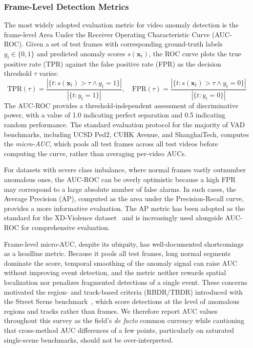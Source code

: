 \documentclass[10pt,a4paper]{article}
\begin{document}
\subsubsection{Frame-Level Detection Metrics}
\label{subsubsec:frame_metrics}

The most widely adopted evaluation metric for video anomaly detection is the frame-level Area Under the Receiver Operating Characteristic Curve (AUC-ROC). Given a set of test frames with corresponding ground-truth labels $y_t \in \{0, 1\}$ and predicted anomaly scores $s(\mathbf{x}_t)$, the ROC curve plots the true positive rate (TPR) against the false positive rate (FPR) as the decision threshold $\tau$ varies:
\begin{equation}
    \text{TPR}(\tau) = \frac{|\{t : s(\mathbf{x}_t) > \tau \wedge y_t = 1\}|}{|\{t : y_t = 1\}|}, \quad
    \text{FPR}(\tau) = \frac{|\{t : s(\mathbf{x}_t) > \tau \wedge y_t = 0\}|}{|\{t : y_t = 0\}|}
    \label{eq:tpr_fpr}
\end{equation}
The AUC-ROC provides a threshold-independent assessment of discriminative power, with a value of 1.0 indicating perfect separation and 0.5 indicating random performance. The standard evaluation protocol for the majority of VAD benchmarks, including UCSD Ped2, CUHK Avenue, and ShanghaiTech, computes the \textit{micro-AUC}, which pools all test frames across all test videos before computing the curve, rather than averaging per-video AUCs.

For datasets with severe class imbalance, where normal frames vastly outnumber anomalous ones, the AUC-ROC can be overly optimistic because a high FPR may correspond to a large absolute number of false alarms. In such cases, the Average Precision (AP), computed as the area under the Precision-Recall curve, provides a more informative evaluation. The AP metric has been adopted as the standard for the XD-Violence dataset~\citep{wu2020not} and is increasingly used alongside AUC-ROC for comprehensive evaluation.

Frame-level micro-AUC, despite its ubiquity, has well-documented shortcomings as a headline metric. Because it pools all test frames, long normal segments dominate the score, temporal smoothing of the anomaly signal can raise AUC without improving event detection, and the metric neither rewards spatial localization nor penalizes fragmented detections of a single event. These concerns motivated the region- and track-based criteria (RBDR/TBDR) introduced with the Street Scene benchmark~\citep{ramachandra2020street}, which score detections at the level of anomalous regions and tracks rather than frames. We therefore report AUC values throughout this survey as the field's \emph{de facto} common currency while cautioning that cross-method AUC differences of a few points, particularly on saturated single-scene benchmarks, should not be over-interpreted.
\end{document}
